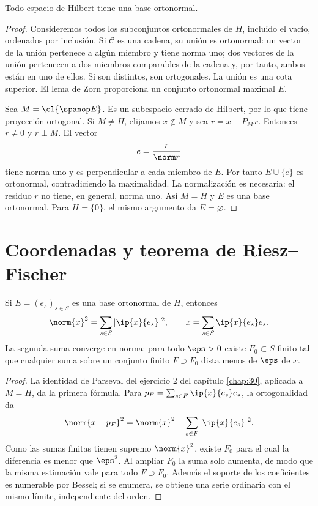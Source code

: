 \begin{teorema}\label{ch31:existencia}
Todo espacio de Hilbert tiene una base ortonormal.
\end{teorema}
\begin{proof}
Consideremos todos los subconjuntos ortonormales de $H$, incluido el vacío, ordenados por inclusión. Si $\mathcal C$ es una cadena, su unión es ortonormal: un vector de la unión pertenece a algún miembro y tiene norma uno; dos vectores de la unión pertenecen a dos miembros comparables de la cadena y, por tanto, ambos están en uno de ellos. Si son distintos, son ortogonales. La unión es una cota superior. El lema de Zorn proporciona un conjunto ortonormal maximal $E$.

Sea $M=\cl{\spanop E}$. Es un subespacio cerrado de Hilbert, por lo que tiene proyección ortogonal. Si $M\ne H$, elijamos $x\notin M$ y sea $r=x-P_Mx$. Entonces $r\ne0$ y $r\perp M$. El vector
\[
 e=\frac{r}{\norm r}
\]
tiene norma uno y es perpendicular a cada miembro de $E$. Por tanto $E\cup\{e\}$ es ortonormal, contradiciendo la maximalidad. La normalización es necesaria: el residuo $r$ no tiene, en general, norma uno. Así $M=H$ y $E$ es una base ortonormal. Para $H=\{0\}$, el mismo argumento da $E=\varnothing$.
\end{proof}

\section{Coordenadas y teorema de Riesz--Fischer}
\begin{teorema}\label{ch31:parseval}
Si $E=(e_s)_{s\in S}$ es una base ortonormal de $H$, entonces
\[
 \norm{x}^{2}=\sum_{s\in S}|\ip{x}{e_s}|^{2},\qquad
 x=\sum_{s\in S}\ip{x}{e_s}e_s.
\]
La segunda suma converge en norma: para todo $\eps>0$ existe $F_0\subset S$ finito tal que cualquier suma sobre un conjunto finito $F\supset F_0$ dista menos de $\eps$ de $x$.
\end{teorema}
\begin{proof}
La identidad de Parseval del ejercicio 2 del capítulo \ref{chap:30}, aplicada a $M=H$, da la primera fórmula. Para $p_F=\sum_{s\in F}\ip{x}{e_s}e_s$, la ortogonalidad da
\[
 \norm{x-p_F}^{2}=\norm{x}^{2}-\sum_{s\in F}|\ip{x}{e_s}|^{2}.
\]
Como las sumas finitas tienen supremo $\norm{x}^{2}$, existe $F_0$ para el cual la diferencia es menor que $\eps^{2}$. Al ampliar $F_0$ la suma solo aumenta, de modo que la misma estimación vale para todo $F\supset F_0$. Además el soporte de los coeficientes es numerable por Bessel; si se enumera, se obtiene una serie ordinaria con el mismo límite, independiente del orden.
\end{proof}

